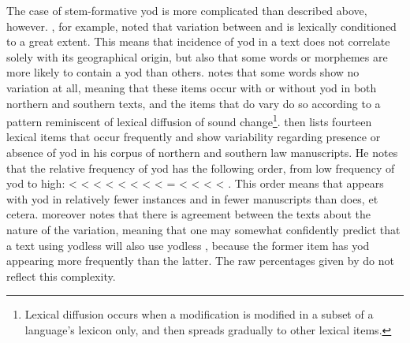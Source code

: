 The case of stem-formative yod is more complicated than described above, however. \Textcite{Rus_Celtic90}, for example, noted that variation between  and  is  lexically conditioned to a great extent. This means that incidence of yod in a text does not correlate solely with its geographical origin, but also that some words or morphemes are more likely to contain a yod than others. \Textcite[106]{Wil_Lexical05}  notes that some words show no variation at all, meaning that these items occur with or without yod in both northern and southern texts, and the items that do vary do so according to a pattern reminiscent of lexical diffusion of sound change\footnote{Lexical diffusion occurs when a modification is modified in a subset of a language's lexicon only, and then spreads gradually to other lexical items.}. \Textcite[116]{Wil_Lexical05} then lists fourteen lexical items that occur frequently and show variability regarding presence or absence of yod in his corpus of northern and southern law manuscripts. He notes that the relative frequency of yod has the following order, from low frequency of yod to high:  <  <  <  <  <  <  <  <  =  <  <  <  < . This order means \eg that  appears with yod in relatively fewer instances and in fewer manuscripts than  does, et cetera. \Textcite[117]{Wil_Lexical05} moreover notes that there is agreement between the texts about the nature of the variation, meaning that one may somewhat confidently predict that a text using yodless  will also use yodless , because the former item has yod appearing more frequently than the latter. The raw percentages given by \textcite{Tho_Middle93} do not reflect this complexity.

